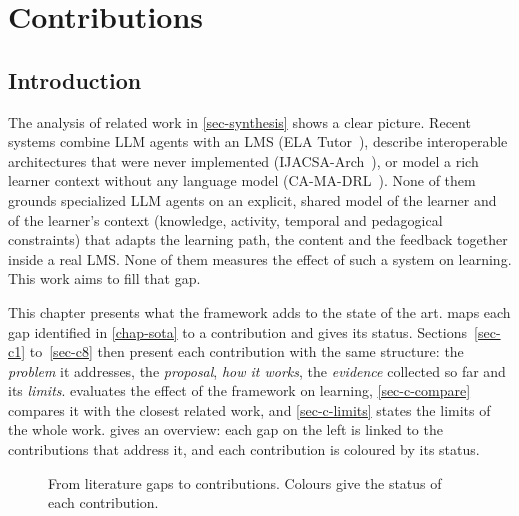 \chapter{Contributions}
\label{chap-contribution}

\section*{Introduction}
\label{sec-c-intro}

The analysis of related work in \cref{sec-synthesis} shows a clear
picture. Recent systems combine LLM agents with an LMS
(ELA Tutor~\cite{lopezgoyez2026ela}), describe interoperable architectures
that were never implemented (IJACSA-Arch~\cite{khaddar2026ijacsa}), or model
a rich learner context without any language model
(CA-MA-DRL~\cite{sharif2026camadrl}). None of them grounds specialized LLM
agents on an explicit, shared model of the learner and of the learner's
context (knowledge, activity, temporal and pedagogical constraints) that
adapts the learning path, the content and the feedback together inside a
real LMS. None of them measures the effect of such a system on learning.
This work aims to fill that gap.

This chapter presents what the framework adds to the state of the art.
 maps each gap identified in \cref{chap-sota} to a
contribution and gives its status. Sections~\ref{sec-c1} to~\ref{sec-c8}
then present each contribution with the same structure: the
\emph{problem} it addresses, the \emph{proposal}, \emph{how it works},
the \emph{evidence} collected so far and its \emph{limits}.
 evaluates the effect of the framework on learning,
\cref{sec-c-compare} compares it with the closest related work, and
\cref{sec-c-limits} states the limits of the whole work.
 gives an overview: each gap on the left is
linked to the contributions that address it, and each contribution is
coloured by its status.

\begin{figure}[htbp]
  \centering
  \caption{From literature gaps to contributions. Colours give the
  status of each contribution.}
  \label{fig-contribution-map}
\end{figure}

